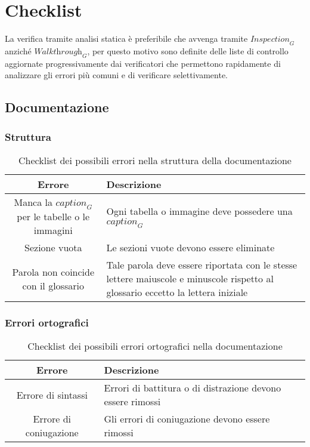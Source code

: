 \section{Checklist}
La verifica tramite analisi statica è preferibile che avvenga tramite $\textit{Inspection}_G$ anziché $\textit{Walkthrough}_G$, per questo motivo sono definite delle liste di controllo aggiornate progressivamente dai verificatori che permettono rapidamente di analizzare gli errori più comuni e di verificare selettivamente.

\subsection{Documentazione}
\subsubsection{Struttura}
\begin{table}[h]
\centering
\begin{tabular}{|c|p{8cm}|}
\hline
\textbf{Errore} & \textbf{Descrizione} \\
\hline
Manca la $\textit{caption}_G$ per le tabelle o le immagini &  Ogni tabella o immagine deve possedere una $\textit{caption}_G$\\
\hline
Sezione vuota & Le sezioni vuote devono essere eliminate\\
\hline
Parola non coincide con il glossario & Tale parola deve essere riportata con le stesse lettere maiuscole e minuscole rispetto al glossario eccetto la lettera iniziale\\
\hline
\end{tabular}
\caption{Checklist dei possibili errori nella struttura della documentazione}
\end{table}

\subsubsection{Errori ortografici}
\begin{table}[h]
\centering
\begin{tabular}{|c|p{8cm}|}
\hline
\textbf{Errore} & \textbf{Descrizione} \\
\hline
Errore di sintassi &  Errori di battitura o di distrazione devono essere rimossi\\
\hline
Errore di coniugazione & Gli errori di coniugazione devono essere rimossi\\
\hline
\end{tabular}
\caption{Checklist dei possibili errori ortografici nella documentazione}
\end{table}

